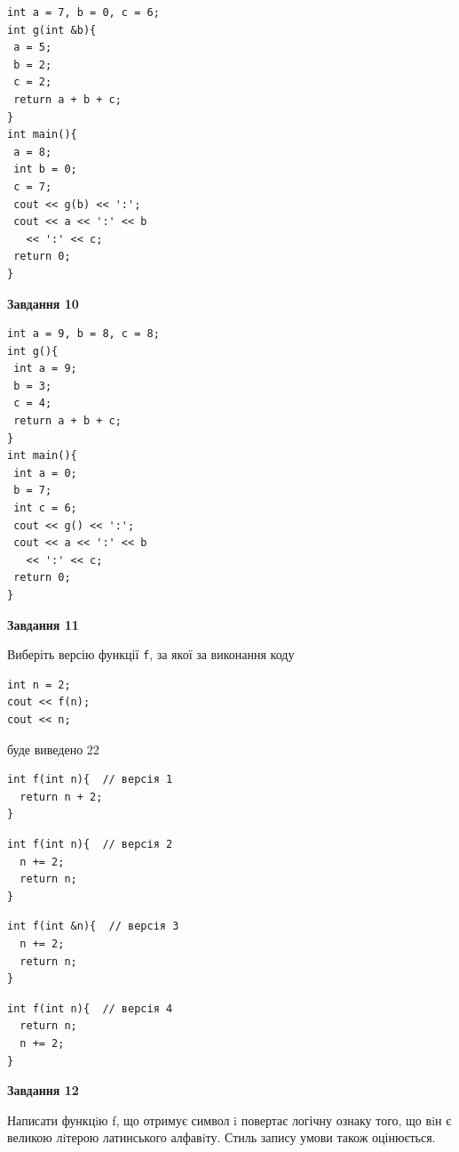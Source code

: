 \documentclass[12pt, ukrainian]{article}
\def\code#1{\Verb!#1!}
\begin{document}
{\begin {large}
\begin{minipage}[t]{7.0cm}
\begin{verbatim}
int a = 7, b = 0, c = 6;
int g(int &b){
 a = 5;
 b = 2;
 c = 2;
 return a + b + c;
}
int main(){
 a = 8;
 int b = 0;
 c = 7;
 cout << g(b) << ':';
 cout << a << ':' << b 
   << ':' << c;
 return 0;
}
\end{verbatim}



\begin{center}
\textbf{Завдання 10}
\end{center}
\vspace{-8mm}

\begin{verbatim}
int a = 9, b = 8, c = 8;
int g(){
 int a = 9;
 b = 3;
 c = 4;
 return a + b + c;
}
int main(){
 int a = 0;
 b = 7;
 int c = 6;
 cout << g() << ':';
 cout << a << ':' << b 
   << ':' << c;
 return 0;
}
\end{verbatim}

\end{minipage}
\vline \hspace{1mm}
\begin{minipage}[t]{11.0cm}

\begin{center}
\textbf{Завдання 11}
\end{center}
Виберіть версію функції \code{f}, за якої за виконання коду
\begin{verbatim}
int n = 2;
cout << f(n);
cout << n;
\end{verbatim}

буде виведено 22

\begin{verbatim}
int f(int n){  // версія 1
  return n + 2;
}
\end{verbatim}

\vspace{-8mm}\begin{verbatim}
int f(int n){  // версія 2
  n += 2;
  return n;
}
\end{verbatim}

\vspace{-8mm}\begin{verbatim}
int f(int &n){  // версія 3
  n += 2;
  return n;
}
\end{verbatim}

\vspace{-8mm}\begin{verbatim}
int f(int n){  // версія 4
  return n;
  n += 2;
}
\end{verbatim}



\begin{center}
\textbf{Завдання 12}
\end{center}

Написати функцiю f, що отримує символ i повертає логічну ознаку того, що вiн є великою лiтерою латинського алфавiту. Стиль запису умови також оцінюється.\par

\end{minipage}

\end {large}}
\newpage
\end{document}
